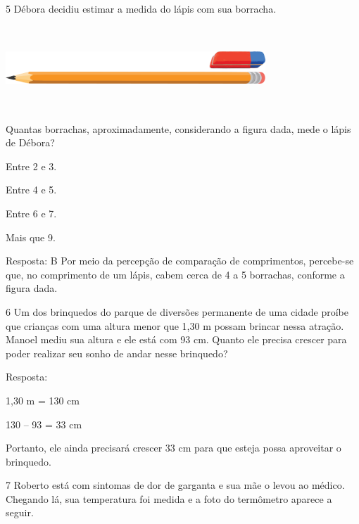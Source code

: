 
\num{5} Débora decidiu estimar a medida do lápis com sua borracha.

\includegraphics[width=3.84200in,height=1.23344in]{media/image46.png}


Quantas borrachas, aproximadamente, considerando a figura dada, mede o lápis de Débora?

\begin{escolha}
\item
  Entre 2 e 3.
\item
  Entre 4 e 5.
\item
  Entre 6 e 7.
\item
  Mais que 9.
\end{escolha}

Resposta: B
Por meio da percepção de comparação de comprimentos, percebe-se que, no
comprimento de um lápis, cabem cerca de 4 a 5 borrachas, conforme a figura dada.

\num{6} Um dos brinquedos do parque de diversões permanente de uma cidade proíbe
que crianças com uma altura menor que 1,30 m possam brincar nessa
atração. Manoel mediu sua altura e ele está com 93 cm. Quanto ele
precisa crescer para poder realizar seu sonho de andar nesse brinquedo?


Resposta:

1,30 m = 130 cm

130 -- 93 = 33 cm

Portanto, ele ainda precisará crescer 33 cm para que esteja possa aproveitar o brinquedo.

\num{7} Roberto está com sintomas de dor de garganta e sua mãe o levou ao
médico. Chegando lá, sua temperatura foi medida e a foto do termômetro
aparece a seguir.

